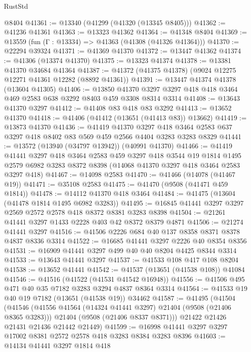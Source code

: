 \begin{lexlean}{RustStd}
\begin{coremodule}
    @8404
@41361 := @13340 (@41299 (@41320 (@13345 @8405)))
@41362 := @41236 @41361
@41363 := @13323 @41362
@41364 := @41348 @8404
@41369 := @13559 (fun (Γ : @13334) => @41363 (@41308 (@41326 @41364)))
@41370 := @22294 @39324
@41371 := @41369 @41370
@41372 := @13447 @41362
@41374 := @41306 (@13374 @41370)
@41375 := @13323 @41374
@41378 := @13381 @41370 @34684 @41364
@41387 := @41372 (@41375 @41378) (@9024 @12275 @12271 @41361 @12282 (@8892 @41361))
@41391 := @13447 @41374 @41378 (@13604 @41305)
@41406 := @13850
    @41370
    @3297
    @3297
    @418
    @418
    @3464
    @469
    @2583
    @638
    @3292
    @8403
    @459
    @3308
    @8314
    @3314
@41408 := @13643 @41370 @3297
@41412 := @41408 @83 @418 @83 @3292
@41413 := @13652 @41370
@41418 := @41406 (@41412 (@13651 (@41413 @83)) @13662)
@41419 := @13873 @41370
@41436 := @41419
    @41370
    @3297
    @418
    @3464
    @2583
    @637
    @3297
    @418
    @8402
    @83
    @569
    @459
    @2566
    @4404
    @3283
    @3283
    @8329
@41441 := @13572 (@13940 (@34797 @13942)) (@40991 @41370)
@41466 := @41419
    @41441
    @3297
    @418
    @3464
    @2583
    @459
    @3297
    @418
    @3544
    @19
    @1814
    @1495
    @2579
    @6982
    @3283
    @8372
    @8398
    (@14068 @41370 @3297 @418 @3464 @2583 @3297 @418)
@41467 := @14098 @2583
@41470 := @41466 (@14078 (@41467 @19))
@41471 := @35108 @2583
@41475 := @41470 (@9508 (@41471 @459 @1814))
@41478 := @14112 @41370 @418 @3464
@41484 := @41475 (@13604 (@41478 @1814 @1495 @6982 @3283))
@41495 := @16845 @41441 @3297 @3297 @2569 @2572 @2578 @418 @8372 @8381 @3283 @8398
@41504 := @21261 @41441 @3297 @1433 @2228 @403 @42 @8372 @8379 @4871
@41506 := @21274 @41441 @3297
@41516 := @41506 @2226 @684 @40 @137 @8358 @8371 @8378 @4837 @8336 @3314
@41522 := @16685 @41441 @3297 @2226 @40 @8354 @8356
@41531 := @16909 @41441 @3297 @499 @40 @40 @8204 @4425 @8344 @3314
@41533 := @13643 @41441 @3297
@41537 := @41533 @108 @417 @108 @8204
@41538 := @13652 @41441
@41542 := @41537 (@13651 (@41538 @108)) @41084
@41546 := @41516 (@41522 (@41531 @41542 @16948))
@41556 := @41506 @495 @471 @40 @35 @7182 @3283 @3294 @4837 @8364 @3314
@41564 := @41533 @19 @40 @19 @7182 (@13651 (@41538 @19)) @34462
@41587 := @41495
    (@41504
      (@41546
        (@41556 @41564 (@14324 @41441 @3297) @21404 (@9508 (@21406 @8365 @3283)))
        @21404
        (@9508 (@21406 @8337 @8371)))
      @21422
      @21426
      @21431
      @21436
      @21442
      @21449)
@41599 := @16998 @41441 @3297 @3297 @17002 @8381 @2572 @2578 @418 @3283 @8384 @3283 @8396
@41603 := @14134 @41441 @3297 @1814 @418

\end{coremodule}
\end{lexlean}
